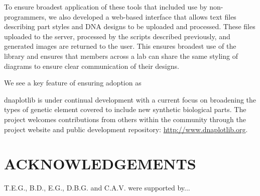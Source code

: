 \documentclass{bioinfo}
\begin{document}

To ensure broadest application of these tools that included use by non-programmers, we also developed a web-based interface that allows text files describing part styles and DNA designs to be uploaded and processed. These files uploaded to the server, processed by the scripts described previously, and generated images are returned to the user. This ensures broadest use of the library and ensures that members across a lab can share the same styling of diagrams to ensure clear communication of their designs.

We see a key feature of ensuring adoption as 







dnaplotlib is under continual development with a current focus on broadening the types of genetic element covered to include new synthetic biological parts. The project welcomes contributions from others within the community through the project website and public development repository: \href{http://www.dnaplotlib.org}{http://www.dnaplotlib.org}.

\section*{ACKNOWLEDGEMENTS}
T.E.G., B.D., E.G., D.B.G. and C.A.V. were supported by...
\end{document}
